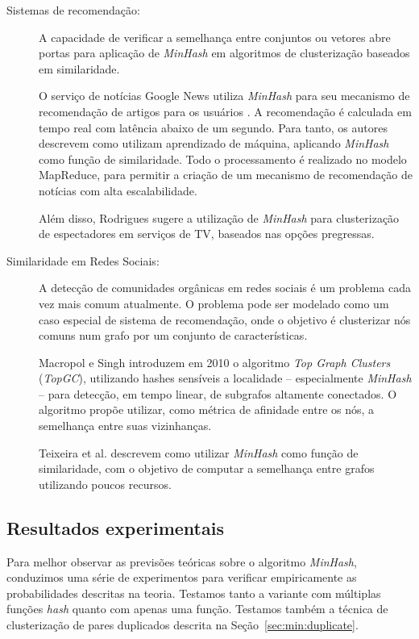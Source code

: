 \begin{description}
\item[Sistemas de recomendação:]

A capacidade de verificar a semelhança entre conjuntos ou vetores abre portas para aplicação de \emph{MinHash} em algoritmos de clusterização baseados em similaridade.

O serviço de notícias Google News utiliza \emph{MinHash} para seu mecanismo de recomendação de artigos para os usuários \cite{das2007google}. A recomendação é calculada em tempo real com latência abaixo de um segundo. Para tanto, os autores descrevem como utilizam aprendizado de máquina, aplicando \emph{MinHash} como função de similaridade. Todo o processamento é realizado no modelo MapReduce, para permitir a criação de um mecanismo de recomendação de notícias com alta escalabilidade.

Além disso, Rodrigues \cite{rodrigues2013recomendaccao} sugere a utilização de \emph{MinHash} para clusterização de espectadores em serviços de TV, baseados nas opções pregressas.

\item[Similaridade em Redes Sociais:]

A detecção de comunidades orgânicas em redes sociais é um problema cada vez mais comum atualmente. O problema pode ser modelado como um caso especial de sistema de recomendação, onde o objetivo é clusterizar nós comuns num grafo por um conjunto de características. 

Macropol e Singh \cite{macropol2010scalable} introduzem em 2010 o algoritmo \emph{Top Graph Clusters} (\emph{TopGC}), utilizando hashes sensíveis a localidade -- especialmente \emph{MinHash} -- para detecção, em tempo linear, de subgrafos altamente conectados. O algoritmo propõe utilizar, como métrica de afinidade entre os nós, a semelhança entre suas vizinhanças.

Teixeira et al. \cite{teixeira2012min} descrevem como utilizar \emph{MinHash} como função de similaridade, com o objetivo de computar a semelhança entre grafos utilizando poucos recursos.


\end{description}

\subsection{Resultados experimentais}\label{sec:min:experiments}

Para melhor observar as previsões teóricas sobre o algoritmo \emph{MinHash}, conduzimos uma série de experimentos para verificar empiricamente as probabilidades descritas na teoria. Testamos tanto a variante com múltiplas funções \emph{hash} quanto com apenas uma função. Testamos também a técnica de clusterização de pares duplicados descrita na Seção~\ref{sec:min:duplicate}.

